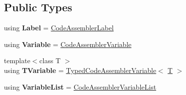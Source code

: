 \subsection*{Public Types}
\begin{DoxyCompactItemize}
\item 
\mbox{\label{classv8_1_1internal_1_1compiler_1_1CodeAssembler_aeeff59a8ec9a425e2ec18dc6f415ccf5}} 
using {\bfseries Label} = \mbox{\hyperlink{classv8_1_1internal_1_1compiler_1_1CodeAssemblerLabel}{Code\+Assembler\+Label}}
\item 
\mbox{\label{classv8_1_1internal_1_1compiler_1_1CodeAssembler_a1d1ebb2e96b8878f71008ff114bd1750}} 
using {\bfseries Variable} = \mbox{\hyperlink{classv8_1_1internal_1_1compiler_1_1CodeAssemblerVariable}{Code\+Assembler\+Variable}}
\item 
\mbox{\label{classv8_1_1internal_1_1compiler_1_1CodeAssembler_ae1b5e3e62f7c016498939ab8c11e33fe}} 
{\footnotesize template$<$class T $>$ }\\using {\bfseries T\+Variable} = \mbox{\hyperlink{classv8_1_1internal_1_1compiler_1_1TypedCodeAssemblerVariable}{Typed\+Code\+Assembler\+Variable}}$<$ \mbox{\hyperlink{classv8_1_1internal_1_1torque_1_1T}{T}} $>$
\item 
\mbox{\label{classv8_1_1internal_1_1compiler_1_1CodeAssembler_a9527383b4fa21768a4aea5ee91fd482d}} 
using {\bfseries Variable\+List} = \mbox{\hyperlink{classv8_1_1internal_1_1ZoneVector}{Code\+Assembler\+Variable\+List}}
\end{DoxyCompactItemize}
